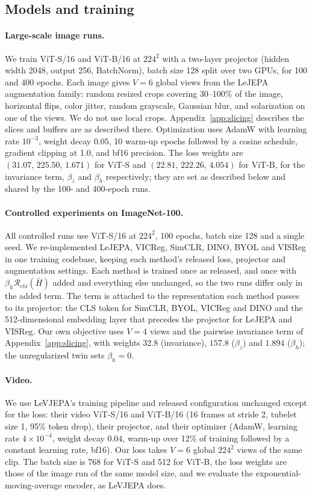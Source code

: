 \documentclass{article} %
\theoremstyle{remark}
\begin{document}
\subsection{Models and training}
\paragraph{Large-scale image runs.}
We train ViT-S/16 and ViT-B/16 at $224^2$ with a two-layer projector (hidden width 2048, output 256, BatchNorm), batch size 128 split over two GPUs, for 100 and 400 epochs. Each image gives $V=6$ global views from the LeJEPA augmentation family: random resized crops covering 30--100\% of the image, horizontal flips, color jitter, random grayscale, Gaussian blur, and solarization on one of the views. We do not use local crops. Appendix~\ref{app:slicing} describes the slices and buffers are as described there. Optimization uses AdamW with learning rate $10^{-3}$, weight decay $0.05$, 10 warm-up epochs followed by a cosine schedule, gradient clipping at 1.0, and bf16 precision. The loss weights are $(31.07,\,225.50,\,1.671)$ for ViT-S and $(22.81,\,222.26,\,4.054)$ for ViT-B, for the invariance term, $\beta_z$ and $\beta_h$ respectively; they are set as described below and shared by the 100- and 400-epoch runs.

\paragraph{Controlled experiments on ImageNet-100.}
All controlled runs use ViT-S/16 at $224^2$, 100 epochs, batch size 128 and a single seed. We re-implemented LeJEPA, VICReg, SimCLR, DINO, BYOL and VISReg in one training codebase, keeping each method's released loss, projector and augmentation settings. Each method is trained once as released, and once with $\beta_h\mathcal R_{\mathrm{ctr}}(\bar H)$ added and everything else unchanged, so the two runs differ only in the added term. The term is attached to the representation each method passes to its projector: the CLS token for SimCLR, BYOL, VICReg and DINO and the 512-dimensional embedding layer that precedes the projector for LeJEPA and VISReg. Our own objective uses $V=4$ views and the pairwise invariance term of Appendix~\ref{app:slicing}, with weights $32.8$ (invariance), $157.8$ ($\beta_z$) and $1.894$ ($\beta_h$); the unregularized twin sets $\beta_h=0$.

\paragraph{Video.}
We use LeVJEPA's training pipeline and released configuration unchanged except for the loss: their video ViT-S/16 and ViT-B/16 (16 frames at stride 2, tubelet size 1, 95\% token drop), their projector, and their optimizer (AdamW, learning rate $4\times10^{-4}$, weight decay $0.04$, warm-up over 12\% of training followed by a constant learning rate, bf16). Our loss takes $V=6$ global $224^2$ views of the same clip. The batch size is 768 for ViT-S and 512 for ViT-B, the loss weights are those of the image run of the same model size, and we evaluate the exponential-moving-average encoder, as LeVJEPA does.
\end{document}
